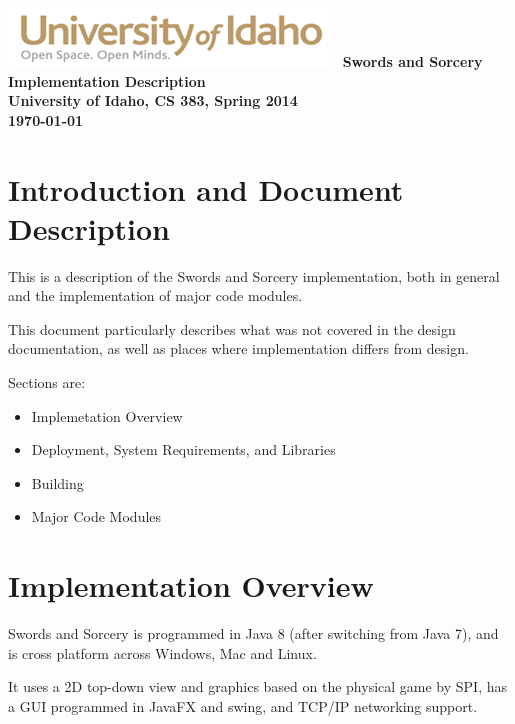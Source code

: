 \documentclass[12pt,a4paper]{article}
\begin{document}
\begin{titlepage}
    \centering
    \vfill
    \vfill
    \includegraphics{UIGraphic}
    \vfill
    {\bfseries\Large
        Swords and Sorcery Implementation Description\\
        University of Idaho, CS 383, Spring 2014\\
        \today
    }    
    \vfill
\end{titlepage}
\section{Introduction and Document Description}
This is a description of the Swords and Sorcery implementation, both in general
and the implementation of major code modules.

This document particularly describes what was not covered in the design
documentation, as well as places where implementation differs from design.

Sections are:
\begin{itemize}
\item Implemetation Overview
\item Deployment, System Requirements, and Libraries
\item Building
\item Major Code Modules
\end{itemize}

\section{Implementation Overview}
Swords and Sorcery is programmed in Java 8 (after switching from Java 7),
and is cross platform across Windows, Mac and Linux.


It uses a 2D top-down view and graphics based on the physical game by SPI,
has a GUI programmed in JavaFX and swing, and TCP/IP networking support.
\end{document}
